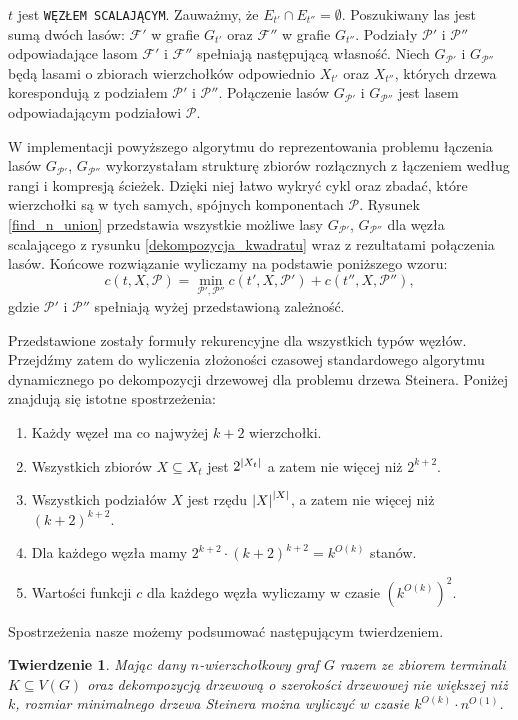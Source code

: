 \documentclass[12pt, oneside]{report}
\newtheorem{theorem}{Twierdzenie}
\newcommand\Omicron{O}
\begin{document}
\noindent $t$ jest \texttt{WĘZŁEM SCALAJĄCYM}. Zauważmy, że $E_{t'} \cap E_{t''} = \emptyset$. Poszukiwany las jest sumą dwóch lasów: $\mathcal{F}'$ w grafie $G_{t'}$ oraz $\mathcal{F}''$ w grafie $G_{t''}$. Podziały $\mathcal{P}'$ i $\mathcal{P}''$ odpowiadające lasom $\mathcal{F}'$ i $\mathcal{F}''$ spełniają następującą własność. Niech $G_{\mathcal{P}'}$ i $G_{\mathcal{P}''}$ będą lasami o zbiorach wierzchołków odpowiednio $X_{t'}$ oraz $X_{t''}$, których drzewa korespondują z podziałem $\mathcal{P'}$ i $\mathcal{P''}$. Połączenie lasów $G_{\mathcal{P}'}$ i $G_{\mathcal{P}''}$ jest lasem odpowiadającym podziałowi $\mathcal{P}$.

W implementacji powyższego algorytmu do reprezentowania problemu łączenia lasów $G_{\mathcal{P}'}$, $G_{\mathcal{P}''}$ wykorzystałam strukturę zbiorów rozłącznych z łączeniem według rangi i kompresją ścieżek. Dzięki niej łatwo wykryć cykl oraz zbadać, które wierzchołki są w tych samych, spójnych komponentach $\mathcal{P}$. Rysunek \ref{find_n_union} przedstawia wszystkie możliwe lasy $G_{\mathcal{P}'}$, $G_{\mathcal{P}''}$ dla węzła scalającego z rysunku \ref{dekompozycja_kwadratu} wraz z rezultatami połączenia lasów.
Końcowe rozwiązanie wyliczamy na podstawie poniższego wzoru:
$$c(t, X, \mathcal{P}) = \min \limits_{\mathcal{P}', \mathcal{P}''} c(t', X, \mathcal{P}') + c(t'', X, \mathcal{P}''),$$ gdzie $\mathcal{P}'$ i $\mathcal{P''}$ spełniają wyżej przedstawioną zależność.

Przedstawione zostały formuły rekurencyjne dla wszystkich typów węzłów. Przejdźmy zatem do wyliczenia złożoności czasowej standardowego algorytmu dynamicznego po dekompozycji drzewowej dla problemu drzewa Steinera. Poniżej znajdują się istotne spostrzeżenia:
\begin{enumerate}[label=(\alph*)]
\item Każdy węzeł ma co najwyżej $k+2$ wierzchołki.
\item Wszystkich zbiorów $X \subseteq X_t$ jest $2^{\abs{X_t}}$ a zatem nie więcej niż $2^{k+2}$.
\item Wszystkich podziałów $X$ jest rzędu $\abs{X}^{\abs{X}}$, a zatem nie więcej niż $(k+2)^{k+2}$.
\item Dla każdego węzła mamy $2^{k+2} \cdot (k+2)^{k+2} = k^{\Omicron(k)}$ stanów.
\item Wartości funkcji $c$ dla każdego węzła wyliczamy w czasie $(k^{\Omicron(k)})^2$.
\end{enumerate}
Spostrzeżenia nasze możemy podsumować następującym twierdzeniem. 
\begin{theorem}
Mając dany $n$-wierzchołkowy graf $G$ razem ze zbiorem terminali $K \subseteq V(G)$ oraz dekompozycją drzewową o szerokości drzewowej nie większej niż $k$, rozmiar minimalnego drzewa Steinera można wyliczyć w czasie $k^{\Omicron(k)} \cdot n^{\Omicron{(1)}}$. 
\end{theorem}
\end{document}
